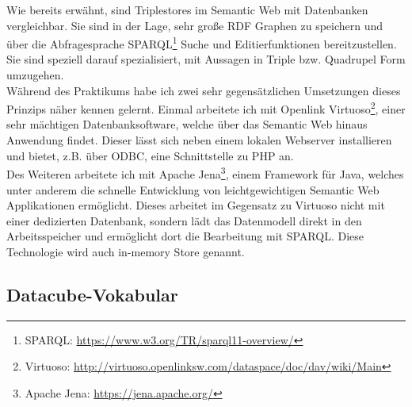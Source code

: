 \documentclass{article}
\begin{document}
Wie bereits erwähnt, sind Triplestores im Semantic Web mit Datenbanken vergleichbar. Sie sind in der Lage, sehr große RDF Graphen zu speichern und über die Abfragesprache SPARQL\footnote{SPARQL: \url{https://www.w3.org/TR/sparql11-overview/}} Suche und Editierfunktionen bereitzustellen. Sie sind speziell darauf spezialisiert, mit Aussagen in Triple bzw. Quadrupel Form umzugehen.\\
Während des Praktikums habe ich zwei sehr gegensätzlichen Umsetzungen dieses Prinzips näher kennen gelernt. Einmal arbeitete ich mit Openlink Virtuoso\footnote{Virtuoso: \url{http://virtuoso.openlinksw.com/dataspace/doc/dav/wiki/Main}}, einer sehr mächtigen Datenbanksoftware, welche über das Semantic Web hinaus Anwendung findet. Dieser lässt sich neben einem lokalen Webserver installieren und bietet, z.B. über ODBC,  eine Schnittstelle zu PHP an.\\
Des Weiteren arbeitete ich mit Apache Jena\footnote{Apache Jena: \url{https://jena.apache.org/}}, einem Framework für Java, welches unter anderem die schnelle Entwicklung von leichtgewichtigen Semantic Web Applikationen ermöglicht. Dieses arbeitet im Gegensatz zu Virtuoso nicht mit einer dedizierten Datenbank, sondern lädt das Datenmodell direkt in den Arbeitsspeicher und ermöglicht dort die Bearbeitung mit SPARQL. Diese Technologie wird auch in-memory Store genannt.

\subsection{Datacube-Vokabular}
\end{document}
